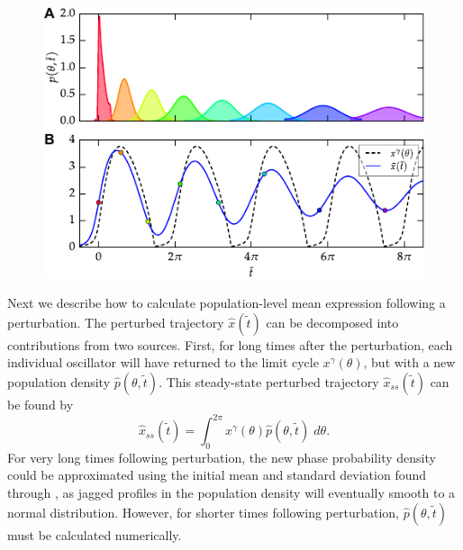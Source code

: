 \begin{figure}[tbp]
  \centering
  \includegraphics[width=.75\textwidth]{chap5/figures/figure_3.pdf}
  \label{fig:53}
\end{figure}

Next we describe how to calculate population-level mean expression following a perturbation.
The perturbed trajectory $\hat{x}(\tilde{t})$ can be decomposed into contributions from two sources.
First, for long times after the perturbation, each individual oscillator will have returned to the limit cycle $x^\gamma(\theta)$, but with a new population density $\hat{p}(\theta, \tilde{t})$.
This steady-state perturbed trajectory $\hat{x}_{ss}(\tilde{t})$ can be found by
\begin{equation}
  \hat{x}_{ss}(\tilde{t}) = \int_0^{2\pi} x^\gamma(\theta) \hat{p}(\theta, \tilde{t}) \; d\theta.
  \label{eq:xhatss}
\end{equation}
For very long times following perturbation, the new phase probability density could be approximated using the initial mean and standard deviation found through , as jagged profiles in the population density will eventually smooth to a normal distribution.
However, for shorter times following perturbation, $\hat{p}(\theta, \tilde{t})$ must be calculated numerically.

